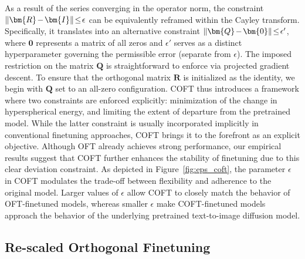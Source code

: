 As a result of the series converging in the operator norm, the constraint $\thickmuskip=2mu \medmuskip=2mu\|\bm{R}-\bm{I}\|\leq\epsilon$ can be equivalently reframed within the Cayley transform. Specifically, it translates into an alternative constraint $\thickmuskip=2mu \medmuskip=2mu \|\bm{Q}-\bm{0}\|\leq\epsilon'$, where $\bm{0}$ represents a matrix of all zeros and $\epsilon'$ serves as a distinct hyperparameter governing the permissible error (separate from $\epsilon$). The imposed restriction on the matrix $\bm{Q}$ is straightforward to enforce via projected gradient descent. To ensure that the orthogonal matrix $\bm{R}$ is initialized as the identity, we begin with $\bm{Q}$ set to an all-zero configuration. COFT thus introduces a framework where two constraints are enforced explicitly: minimization of the change in hyperspherical energy, and limiting the extent of departure from the pretrained model. While the latter constraint is usually incorporated implicitly in conventional finetuning approaches, COFT brings it to the forefront as an explicit objective. Although OFT already achieves strong performance, our empirical results suggest that COFT further enhances the stability of finetuning due to this clear deviation constraint. As depicted in Figure~\ref{fig:eps_coft}, the parameter $\epsilon$ in COFT modulates the trade-off between flexibility and adherence to the original model. Larger values of $\epsilon$ allow COFT to closely match the behavior of OFT-finetuned models, whereas smaller $\epsilon$ make COFT-finetuned models approach the behavior of the underlying pretrained text-to-image diffusion model.

\subsection{Re-scaled Orthogonal Finetuning}

